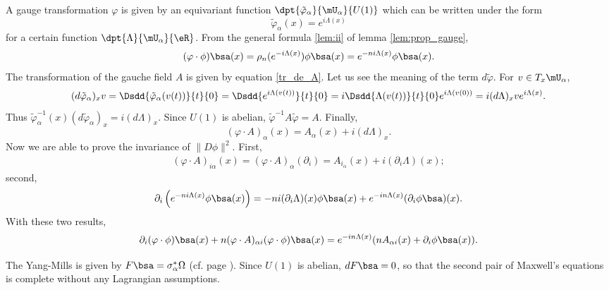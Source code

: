 A gauge transformation $\varphi$ is given by an equivariant function $\dpt{\tilde{\varphi}_{\alpha}}{\mU_{\alpha}}{U(1)}$ which can be written under the form
\[
   \tilde{\varphi}_{\alpha}(x)=e^{i\Lambda(x)}
\]
for a certain function $\dpt{\Lambda}{\mU_{\alpha}}{\eR}$. From the general formula \ref{lem:ii} of lemma \ref{lem:prop_gauge},
\begin{equation}
  (\varphi\cdot\phi)\bsa(x)=\rho_n(e^{-i\Lambda(x)})\phi\bsa(x)
                          =e^{-ni\Lambda(x)}\phi\bsa(x).
\end{equation}
The transformation of the gauche field $A$ is given by equation \eqref{tr_de_A}. Let us see the meaning of the term $d\tilde{\varphi}$. For $v\in T_x\mU_{\alpha}$,
\begin{equation}
  (d\tilde{\varphi}_{\alpha})_xv=\Dsdd{\tilde{\varphi}_{\alpha}(v(t))}{t}{0}
                   =\Dsdd{ e^{i\Lambda(v(t))} }{t}{0}
		   =i\Dsdd{\Lambda(v(t))}{t}{0}e^{i\Lambda(v(0))}
		   =i(d\Lambda)_xve^{i\Lambda(x)}.
\end{equation}
Thus $\tilde{\varphi}_{\alpha}^{-1}(x)(d\tilde{\varphi}_{\alpha})_x=i(d\Lambda)_x$. Since $U(1)$ is abelian, $\tilde{\varphi}^{-1} A\tilde{\varphi}=A$. Finally,
\begin{equation}
  (\varphi\cdot A)_{\alpha}(x)=A_{\alpha}(x)+i(d\Lambda)_x.
\end{equation}
Now we are able to prove the invariance of $\|D\phi\|^2$. First,
\begin{equation}
\begin{split}
  (\varphi\cdot A)_{i\alpha}(x)=(\varphi\cdot A)_{\alpha}(\partial_i)
                           =A_{i_{\alpha}}(x)+i(\partial_i\Lambda)(x);
\end{split}
\end{equation}
second,
\begin{equation}
\partial_i\left(  e^{-ni\Lambda(x)}\phi\bsa(x)  \right)=-ni(\partial_i\Lambda)(x)\phi\bsa(x)+e^{-in\Lambda(x)}(\partial_i\phi\bsa)(x).
\end{equation}
With these two results, 
\begin{equation}
\partial_i(\varphi\cdot\phi)\bsa(x)+n(\varphi\cdot A)_{\alpha i}(\varphi\cdot\phi)\bsa(x)=e^{-in\Lambda(x)}( nA_{\alpha i}(x)+\partial_i\phi\bsa(x) ).
\end{equation}

The Yang-Mills  is given by $F\bsa=\sigma^*_{\alpha}\Omega$ (cf. page \pageref{pg:curv_princ}). Since $U(1)$ is abelian, $dF\bsa=0$, so that the second pair of Maxwell's equations is complete without any Lagrangian assumptions.

